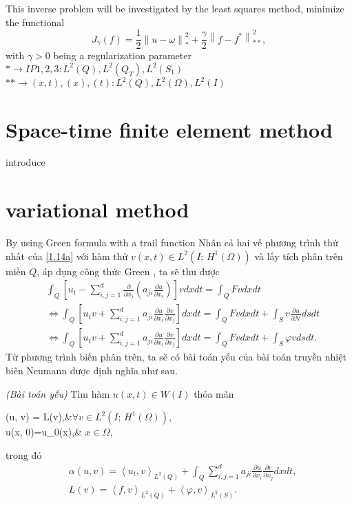 \documentclass[]{article}
\begin{document}
This inverse problem will be investigated by the least squares method, minimize the functional
$$J_{\gamma}(f)=\frac{1}{2}\left\|u-\omega\right\|_{*}^2+\frac{\gamma}{2}\left\|f-f^*\right\|_{**}^2,$$
with $\gamma>0$ being a regularization parameter\\
$*\to IP1, 2, 3: L^2(Q), L^2(Q_T), L^2(S_1)$\\
$** \to (x, t), (x), (t): L^2(Q), L^2(\Omega), L^2(I)$


\section{Space-time finite element method}
introduce
\section{variational method}
By using Green formula with a trail function
\qquad Nhân cả hai vế phương trình thứ nhất của \eqref{1.14a} với hàm thử $v(x, t)\in L^2(I;\, H^1(\Omega))$ và lấy tích phân trên miền $Q$, áp dụng công thức Green \cite{b6}, ta sẽ thu được
\begin{align*}
	&\int_{Q}\left[u_t-\sum_{i, j=1}^{d}\frac{\partial}{\partial x_j}\left(a_{ji}\frac{\partial u}{\partial x_i}\right)\right]vdxdt=\int_{Q}Fvdxdt\\
	&\Leftrightarrow\int_{Q}\left[u_tv+\sum_{i, j=1}^{d}a_{ji}\frac{\partial u}{\partial x_i}\frac{\partial v}{\partial x_j}\right]dxdt=\int_{Q}Fvdxdt+\int_{S}v\frac{\partial u}{\partial \mathcal{N}}dsdt\\
	&\Leftrightarrow\int_{Q}\left[u_tv+\sum_{i, j=1}^{d}a_{ji}\frac{\partial u}{\partial x_i}\frac{\partial v}{\partial x_j}\right]dxdt=\int_{Q}Fvdxdt+\int_{S}\varphi vdsdt.
\end{align*}
Từ phương trình biến phân trên, ta sẽ có bài toán yếu của bài toán truyền nhiệt biên Neumann được định nghĩa như sau.
\begin{dn}{\textit{(Bài toán yếu)}}\label{dn2.1}
	Tìm hàm $u(x, t)\in W(I)$ thỏa mãn
	\begin{subnumcases}{}
		\alpha(u, v) = L(v),&$\forall v\in L^2(I;\, H^1(\Omega))$,\label{2.1a}\\
		u(x, 0)=u_0(x),& $x\in \Omega$, \label{2.1b}
	\end{subnumcases}
	trong đó
	\begin{align*}
		&\alpha(u, v) = \left\langle u_t, v\right\rangle_{L^2(Q)}+\int_{Q}\sum_{i, j=1}^{d}a_{ji}\frac{\partial u}{\partial x_i}\frac{\partial v}{\partial x_j}dxdt,\\
		&L(v)=\left\langle f, v\right\rangle_{L^2(Q)}+\left\langle \varphi, v\right\rangle_{L^2(S)}.
	\end{align*}
\end{dn}
\end{document}
